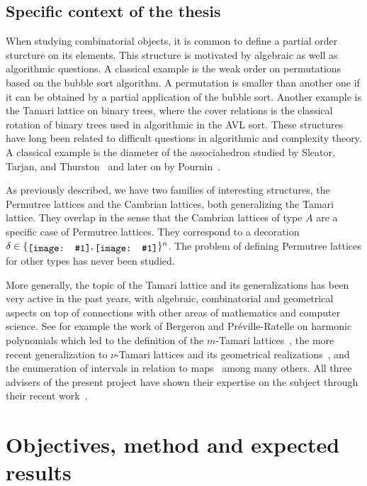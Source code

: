 \documentclass[a4paper,12pt]{article}
\newcommand{\includeSymbol}[1]{\ensuremath{%
	\mathchoice
		{\raisebox{-.7mm}{\texttt{[image: \#1]}}}	
		{\raisebox{-.7mm}{\texttt{[image: \#1]}}}
		{\raisebox{-.6mm}{\texttt{[image: \#1]}}}
		{\raisebox{-.5mm}{\texttt{[image: \#1]}}}
}}
\newcommand{\upCirc}{\includeSymbol{up}}
\newcommand{\downCirc}{\includeSymbol{down}}
\begin{document}
\subsection{Specific context of the thesis}

When studying combinatorial objects, it is common to define a partial order sturcture on its elements. This structure is motivated by algebraic as well as algorithmic questions. A classical example is the weak order on permutations based on the bubble sort algorithm. A permutation is smaller than another one if it can be obtained by a partial application of the bubble sort. Another example is the Tamari lattice on binary trees, where the cover relations is the classical rotation of binary trees used in algorithmic in the AVL sort. These structures have long been related to difficult questions in algorithmic and complexity theory. A classical example is the diameter of the associahedron studied by Sleator, Tarjan, and Thurston~\cite{AssoDiam86} and later on by Pournin~\cite{AssoDiam}.

As previously described, we have two families of interesting structures, the Permutree lattices and the Cambrian lattices, both generalizing the Tamari lattice. They overlap in the sense that the Cambrian lattices of type $A$ are a specific case of Permutree lattices. They correspond to a decoration $\delta \in \lbrace \upCirc, \downCirc \rbrace^n$. The problem of defining Permutree lattices for other types has never been studied.

More generally, the topic of the Tamari lattice and its generalizations has been very active in the past years, with algebraic, combinatorial and geometrical aspects on top of connections with other areas of mathematics and computer science. See for example the work of Bergeron and Préville-Ratelle on harmonic polynomials which led to the definition of the $m$-Tamari lattices~\cite{BergmTamari}, the more recent generalization to $\nu$-Tamari lattices and its geometrical realizations~\cite{RatelleViennot, mTamGeom}, and the enumeration of intervals in relation to maps~\cite{BijTriangulations, FangPrevilleRatelle} among many others. All three advisers of the present project have shown their expertise on the subject through their recent work~\cite{HivertNovelliThibon-algebraBinarySearchTrees, LangePilaud, ChatelPilaud, ChatelPons, PilaudPons-permutrees, ChatelPilaudPons, CeballosPonsFPSAC}. 

\section{Objectives, method and expected results}
\end{document}
